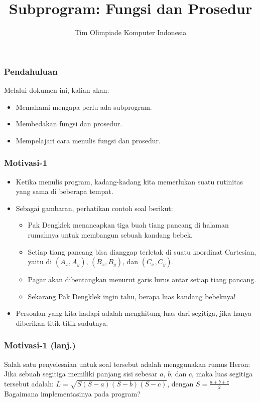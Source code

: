 \documentclass{beamer}
\title{Subprogram: \newline Fungsi dan Prosedur}
\author{Tim Olimpiade Komputer Indonesia}
\begin{document}
\begin{frame}
\titlepage
\end{frame}

\begin{frame}
\frametitle{Pendahuluan}
Melalui dokumen ini, kalian akan:
\begin{itemize}
	\item Memahami mengapa perlu ada subprogram.
	\item Membedakan fungsi dan prosedur.
	\item Mempelajari cara menulis fungsi dan prosedur.
\end{itemize}
\end{frame}

\begin{frame}
\frametitle{Motivasi-1}
\begin{itemize}
	\item Ketika menulis program, kadang-kadang kita memerlukan suatu rutinitas yang sama di beberapa tempat.
	\item Sebagai gambaran, perhatikan contoh soal berikut:
	\begin{itemize}
		\item Pak Dengklek menancapkan tiga buah tiang pancang di halaman rumahnya untuk membangun sebuah kandang bebek.
		\item Setiap tiang pancang bisa dianggap terletak di suatu koordinat Cartesian, yaitu di $(A_x, A_y)$, $(B_x, B_y)$, dan $(C_x, C_y)$.
		\item Pagar akan dibentangkan menurut garis lurus antar setiap tiang pancang.
		\item Sekarang Pak Dengklek ingin tahu, berapa luas kandang bebeknya!
	\end{itemize}
	\item Persoalan yang kita hadapi adalah menghitung luas dari segitiga, jika hanya diberikan titik-titik sudutnya.
\end{itemize}
\end{frame}

\begin{frame}
\frametitle{Motivasi-1 (lanj.)}
Salah satu penyelesaian untuk soal tersebut adalah menggunakan rumus Heron:
\newline \newline
Jika sebuah segitiga memiliki panjang sisi sebesar $a$, $b$, dan $c$, maka luas segitiga tersebut adalah:
\newline
$L = \sqrt{S(S-a)(S-b)(S-c)}$, dengan $S = \frac{a+b+c}{2}$
\vfill
Bagaimana implementasinya pada program?
\end{frame}
\end{document}
